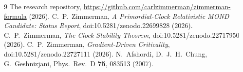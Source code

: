 \documentclass[11pt,letterpaper]{article}
\begin{document}
\begin{thebibliography}{9}
 The research repository, \url{https://github.com/carlzimmerman/zimmerman-formula} (2026).
 C.~P.~Zimmerman, \emph{A Primordial-Clock Relativistic MOND Candidate: Status Report}, doi:10.5281/zenodo.22699828 (2026).
 C.~P.~Zimmerman, \emph{The Clock Stability Theorem}, doi:10.5281/zenodo.22717950 (2026).
 C.~P.~Zimmerman, \emph{Gradient-Driven Criticality}, doi:10.5281/zenodo.22727111 (2026).
 N.~Afshordi, D.~J.~H.~Chung, G.~Geshnizjani, Phys.\ Rev.\ D \textbf{75}, 083513 (2007).
\end{thebibliography}
\end{document}
